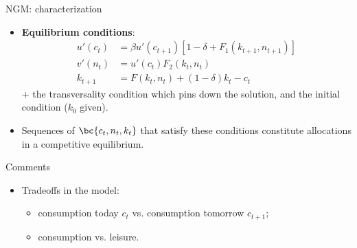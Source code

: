 \documentclass[11pt,xcolor={dvipsnames},aspectratio=159,hyperref={pdftex,pdfpagemode=UseNone,hidelinks,pdfdisplaydoctitle=true},usepdftitle=false]{beamer}
\begin{document}
\begin{frame}{NGM: characterization}
    \begin{itemize}
    \item \textbf{Equilibrium conditions}: 
    \begin{align}
    u'\left(c_{t}\right) & =\beta u'\left(c_{t+1}\right)\left[1-\delta+F_{1}\left(k_{t+1},n_{t+1}\right)\right]\tag{EE}\label{EE}\\
    v'\left(n_{t}\right) & =u'\left(c_{t}\right)F_{2}\left(k_{t},n_{t}\right)\tag{LS}\label{LS}\\
    k_{t+1} & =F\left(k_{t},n_{t}\right)+\left(1-\delta\right)k_{t}-c_{t}\tag{LoM}\label{LoM}
    \end{align}
    + the transversality condition which pins down the solution, and the initial condition ($k_0$ given).     
    \item Sequences of $\bc{c_t, n_t, k_t}$ that satisfy these conditions constitute allocations in a competitive equilibrium. 
\end{itemize}
    
    \end{frame}        
    
\begin{frame}{Comments}
    \begin{itemize}
    \item Tradeoffs in the model:
    \begin{itemize}
    \item consumption today $c_{t}$ vs. consumption tomorrow $c_{t+1}$;
    \item consumption vs. leisure.
    \end{itemize}
    \end{itemize}
    \end{frame}


    \begin{frame}
    \end{frame}
\end{document}
